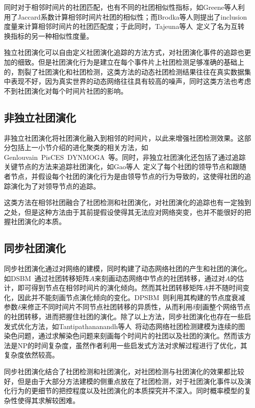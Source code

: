 同时对于相邻时间片的社团匹配，也有不同的社团相似性指标，如Greene等人\cite{greene2010tracking}利用了Jaccard系数计算相邻时间片社团的相似性；而Brodka等人\cite{brodka2013ged}则提出了inclusion度量来计算相邻时间片的社团匹配度；于此同时，Tajeuna等人~\cite{tajeuna2015tracking}定义了名为互转换指标的另一种相似性度量。

独立社团演化可以自由定义社团演化追踪的方法方式，对社团演化事件的追踪也更加的细致。但是社团演化行为是建立在每个事件片上社团检测足够准确的基础上的，割裂了社团演化和社团检测，这类方法的动态社团检测结果往往在真实数据集中表现不好，因为真实世界的动态网络往往具有较高的噪声，同时这类方法也考虑不到社团演化对每个时间片社团的影响。

\subsection{非独立社团演化}
非独立社团演化将社团演化融入到相邻的时间片，以此来增强社团检测效果。这部分包括上一小节介绍的进化聚类的相关方法，如Genlouvain~\cite{jutla2011generalized}PisCES~\cite{liu2018global}DYNMOGA~\cite{folino2014evolutionary}等。同时，非独立社团演化还包括了通过追踪关键节点的方法来追踪社团演化，如Gao等人~\cite{gao2016evolutionary}定义了每个社团的领导节点和跟随者节点，并假设每个社团的演化行为是由领导节点的行为导致的，这使得社团的追踪演化为了对领导节点的追踪。

这类方法在相邻社团融合了社团检测和社团演化，对社团演化的追踪也有一定独到之处，但是这种方法由于其前提假设使得其无法应对网络突变，也并不能很好的把握社团演化的本质。
\subsection{同步社团演化}

同步社团演化通过对网络的建模，同时构建了动态网络社团的产生和社团的演化。如DSBM~\cite{yang2011detecting}通过社团转移矩阵$A$来刻画动态网络中节点的社团转移，通过对$A$的估计，即可得到节点在相邻时间片的演化倾向。然而其社团转移矩阵$A$并不随时间变化，因此并不能刻画节点演化倾向的变化。DPSBM~\cite{wu2019dynamic}则利用其构建的节点度衰减参数$\delta$来修正不同时间片不同节点社团转移的异质性，从而利用$\delta$刻画整个网络节点的社团转移，进而把握住社团的演化。除了以上方法，同步社团演化也存在一些启发式优化方法，如Tantipathananandh等人~\cite{tantipathananandh2011finding}将动态网络社团检测建模为连续的图染色问题，通过求解染色问题来刻画每个时间片的社团以及社团的演化。然而该方法是NP的时间复杂度，虽然作者利用一些启发式方法对求解过程进行了优化，其复杂度依然较高。

同步社团演化结合了社团检测和社团演化，对社团检测与社团演化的效果都比较好，但是由于大部分方法建模的侧重点放在了社团检测，对于社团演化事件以及演化行为的更细节的把控程度以及社团演化的本质探究并不深入。同时概率模型的复杂性使得其求解较困难。


